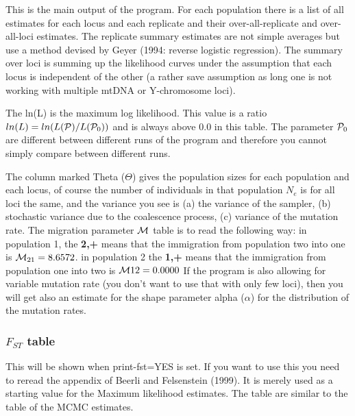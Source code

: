 This is the main output of the program. For each population there is a list
of all estimates for each locus and each replicate and their over-all-replicate and over-all-loci estimates. The replicate summary estimates are not simple averages but use a method devised by Geyer (1994: reverse logistic regression). The summary over loci is summing up the likelihood curves under the assumption that each locus is independent of the other (a rather save assumption as long one is not working with multiple mtDNA or Y-chromosome loci).
\par
The ln(L) is the maximum log likelihood.
This value is a ratio $ln(L) = ln(L(\P)/L(\P_0))$ and is always above 0.0 in this table. The parameter $\P_0$ are
different between different runs of the program and therefore you cannot
simply compare between different runs.
\par
The column marked Theta ($\Theta$) gives the population sizes for 
each population and each locus, of course the number of individuals
in that population $N_e$ is for all loci the same, and the variance you see
is (a)  the variance of the sampler, 
(b) stochastic variance due to the coalescence
process, (c) variance of the mutation rate.
The migration parameter $\M$  table is to read the following way:
in population 1, the {\bf 2,+} means that the immigration from population two into one is $\M_{21}=8.6572$.
in population 2 the {\bf 1,+} means that the immigration from population one into two is $\M{12}=0.0000$
If the program is also allowing for variable mutation rate (you don't want to
use that with only few loci), then you will get also an estimate for the 
shape parameter alpha ($\alpha$) for the distribution of the mutation rates.  

\subsubsection{$F_{ST}$ table}
This will be shown when print-fst=YES is set. If you want to use this you need to reread the appendix of Beerli and Felsenstein (1999). It is merely used as a starting 
value for the Maximum likelihood estimates. The table are similar to the table
of the MCMC estimates.

